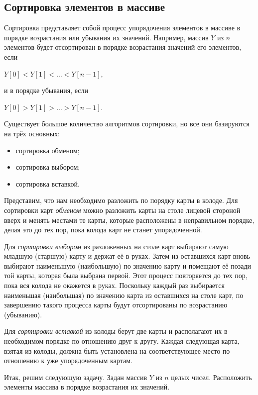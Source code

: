 \subsection[Сортировка элементов в массиве]{Сортировка элементов в массиве}
Сортировка представляет собой процесс упорядочения элементов в массиве в
порядке возрастания или убывания их значений. Например, массив $Y$ из $n$ элементов
будет отсортирован в порядке возрастания значений его элементов, если

 $Y[0]<Y[1]<{\dots}<Y[n-1]$,

и в порядке убывания, если

 $Y[0]>Y[1]>{\dots}>Y[n-1]$.

Существует большое количество алгоритмов сортировки, но все они базируются на трёх основных:

\begin{itemize}
\item сортировка обменом;
\item сортировка выбором;
\item сортировка вставкой.
\end{itemize}

Представим, что нам необходимо разложить по порядку карты в колоде. Для сортировки карт \emph{обменом} можно разложить
карты на столе лицевой стороной вверх и менять местами те карты, которые расположены в неправильном порядке, делая это
до тех пор, пока колода карт не станет упорядоченной.

Для \emph{сортировки выбором} из разложенных на столе карт выбирают самую младшую (старшую) карту и держат её в руках.
Затем из оставшихся карт вновь выбирают наименьшую (наибольшую) по значению карту и помещают её позади той карты,
которая была выбрана первой. Этот процесс повторяется до тех пор, пока вся колода не окажется в руках. Поскольку каждый
раз выбирается наименьшая (наибольшая) по значению карта из оставшихся на столе карт, по завершению такого процесса
карты будут отсортированы по возрастанию (убыванию).

Для \emph{сортировки вставкой} из колоды берут две карты и располагают их в необходимом порядке по отношению друг к
другу. Каждая следующая карта, взятая из колоды, должна быть установлена на соответствующее место по отношению к уже
упорядоченным картам.

Итак, решим следующую задачу. Задан массив $Y$ из $n$ целых чисел. Расположить элементы массива в порядке возрастания их
значений.

